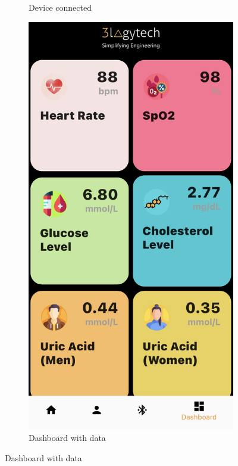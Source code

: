 \documentclass[a4paper]{scrreprt}
\begin{document}
\begin{figure}[htbp]
\begin{subfigure}{0.45\textwidth}
        \caption{Device connected}
        \label{fig:graph1}
    \end{subfigure}
    \begin{subfigure}{0.45\textwidth}
        \centering
        \includegraphics[scale=0.15]{dashboard_data.jpeg}
        \caption{Dashboard with data}
        \label{fig:graph2}
    \end{subfigure}
    \label{fig:finddev}
\end{figure}
\clearpage
\end{document}
